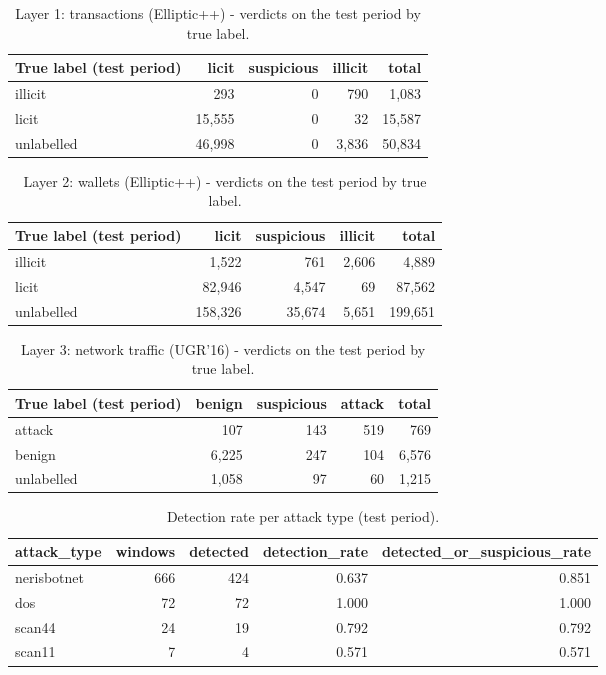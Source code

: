 \begin{table}[t]
\centering
\caption{Layer 1: transactions (Elliptic++) - verdicts on the test period by true label.}
\label{tab:transaction-verdicts}
\begin{tabular}{lrrrr}
\toprule
True label (test period) & licit & suspicious & illicit & total \\
\midrule
illicit & 293 & 0 & 790 & 1,083 \\
licit & 15,555 & 0 & 32 & 15,587 \\
unlabelled & 46,998 & 0 & 3,836 & 50,834 \\
\bottomrule
\end{tabular}
\end{table}

\begin{table}[t]
\centering
\caption{Layer 2: wallets (Elliptic++) - verdicts on the test period by true label.}
\label{tab:wallet-verdicts}
\begin{tabular}{lrrrr}
\toprule
True label (test period) & licit & suspicious & illicit & total \\
\midrule
illicit & 1,522 & 761 & 2,606 & 4,889 \\
licit & 82,946 & 4,547 & 69 & 87,562 \\
unlabelled & 158,326 & 35,674 & 5,651 & 199,651 \\
\bottomrule
\end{tabular}
\end{table}

\begin{table}[t]
\centering
\caption{Layer 3: network traffic (UGR'16) - verdicts on the test period by true label.}
\label{tab:network-verdicts}
\begin{tabular}{lrrrr}
\toprule
True label (test period) & benign & suspicious & attack & total \\
\midrule
attack & 107 & 143 & 519 & 769 \\
benign & 6,225 & 247 & 104 & 6,576 \\
unlabelled & 1,058 & 97 & 60 & 1,215 \\
\bottomrule
\end{tabular}
\end{table}

\begin{table}[t]
\centering
\caption{Detection rate per attack type (test period).}
\label{tab:network-attacks}
\begin{tabular}{lrrrr}
\toprule
attack\_type & windows & detected & detection\_rate & detected\_or\_suspicious\_rate \\
\midrule
nerisbotnet & 666 & 424 & 0.637 & 0.851 \\
dos & 72 & 72 & 1.000 & 1.000 \\
scan44 & 24 & 19 & 0.792 & 0.792 \\
scan11 & 7 & 4 & 0.571 & 0.571 \\
\bottomrule
\end{tabular}
\end{table}

